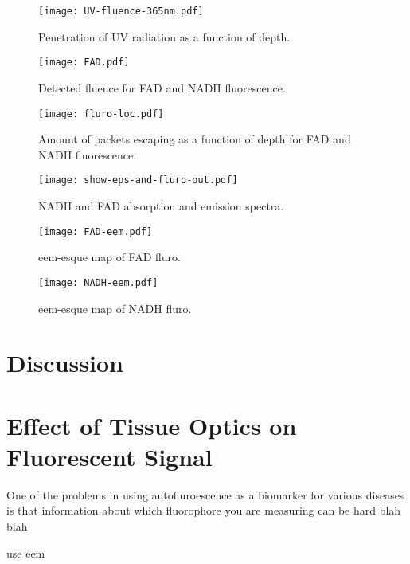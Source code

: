 \begin{figure}[!htpb]
    \centering
    \texttt{[image: UV-fluence-365nm.pdf]}
    \caption{Penetration of UV radiation as a function of depth.}
    \label{fig:uvpen}
\end{figure}

\begin{figure}[!htpb]
    \centering
    \texttt{[image: FAD.pdf]}
    \caption{Detected fluence for FAD and NADH fluorescence.}
    \label{fig:fadnadhboth}
\end{figure}

\begin{figure}[!htpb]
    \centering
    \texttt{[image: fluro-loc.pdf]}
    \caption{Amount of packets escaping as a function of depth for FAD and NADH fluorescence.}
    \label{fig:floc}
\end{figure}

\begin{figure}[!htpb]
    \centering
    \texttt{[image: show-eps-and-fluro-out.pdf]}
    \caption{NADH and FAD absorption and emission spectra.}
    \label{fig:epsfluro}
\end{figure}

\begin{figure}[!htpb]
    \centering
    \texttt{[image: FAD-eem.pdf]}
    \caption{eem-esque map of FAD fluro.}
    \label{fig:fadeem}
\end{figure}

\begin{figure}[!htpb]
    \centering
    \texttt{[image: NADH-eem.pdf]}
    \caption{eem-esque map of NADH fluro.}
    \label{fig:nadheem}
\end{figure}

\section{Discussion}

\section{Effect of Tissue Optics on Fluorescent Signal}

One of the problems in using autofluroescence as a biomarker for various diseases is that information about which fluorophore you are measuring can be hard blah blah

use eem

